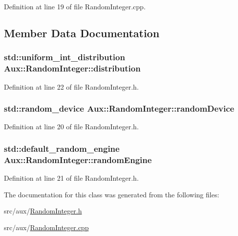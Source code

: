 Definition at line 19 of file Random\-Integer.\-cpp.



\subsection{Member Data Documentation}
\hypertarget{class_aux_1_1_random_integer_afcc41e2a6c0897591c848d7461bd9c5a}{
\subsubsection[{distribution}]{\setlength{\rightskip}{0pt plus 5cm}std\-::uniform\-\_\-int\-\_\-distribution Aux\-::\-Random\-Integer\-::distribution\hspace{0.3cm}{\ttfamily [protected]}}}\label{class_aux_1_1_random_integer_afcc41e2a6c0897591c848d7461bd9c5a}


Definition at line 22 of file Random\-Integer.\-h.

\hypertarget{class_aux_1_1_random_integer_ad53ce69ad39005e2d155c3d7d3557873}{
\subsubsection[{random\-Device}]{\setlength{\rightskip}{0pt plus 5cm}std\-::random\-\_\-device Aux\-::\-Random\-Integer\-::random\-Device\hspace{0.3cm}{\ttfamily [protected]}}}\label{class_aux_1_1_random_integer_ad53ce69ad39005e2d155c3d7d3557873}


Definition at line 20 of file Random\-Integer.\-h.

\hypertarget{class_aux_1_1_random_integer_a5a4fca08fd29e0b6304d8294441c5711}{
\subsubsection[{random\-Engine}]{\setlength{\rightskip}{0pt plus 5cm}std\-::default\-\_\-random\-\_\-engine Aux\-::\-Random\-Integer\-::random\-Engine\hspace{0.3cm}{\ttfamily [protected]}}}\label{class_aux_1_1_random_integer_a5a4fca08fd29e0b6304d8294441c5711}


Definition at line 21 of file Random\-Integer.\-h.



The documentation for this class was generated from the following files\-:\begin{DoxyCompactItemize}
\item 
src/aux/\hyperlink{_random_integer_8h}{Random\-Integer.\-h}\item 
src/aux/\hyperlink{_random_integer_8cpp}{Random\-Integer.\-cpp}\end{DoxyCompactItemize}
